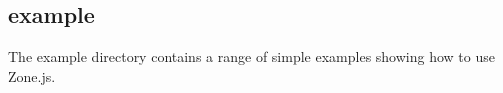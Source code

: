\subsection{example}

The example directory contains a range of simple examples showing how to use
Zone.js.
